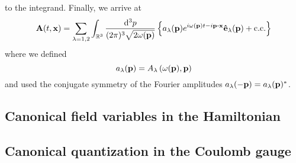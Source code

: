 to the integrand.
Finally, we arrive at
\begin{equation}
	\vb{A}(t,\vb{x})
	=
	\sum_{\lambda=1,2}
	\int_{\mathbb{R}^3}\frac{\dd[3]{p}}{(2\pi)^3\sqrt{2\omega(\vb{p})}}
	\left\{
		a_\lambda(\vb{p})
		e^{i\omega(\vb{p})t-i\vb{p}\vdot\vb{x}}
		\vu{e}_\lambda(\vb{p})
		+
		\text{c.c.}
	\right\}
\end{equation}
where we defined
\begin{equation}
	a_\lambda(\vb{p})
	=
	A_\lambda\left(\omega(\vb{p}),\vb{p}\right)
\end{equation}
and used the conjugate symmetry of the Fourier amplitudes $a_\lambda(-\vb{p})=a_\lambda(\vb{p})^*$.

\subsection{Canonical field variables in the Hamiltonian}

\subsection{Canonical quantization in the Coulomb gauge}